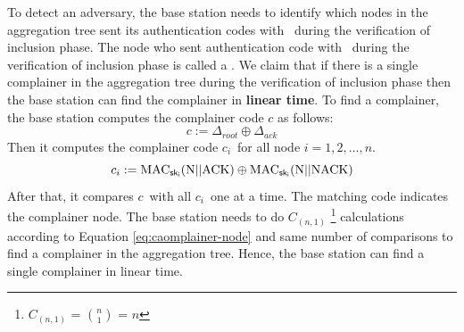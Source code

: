 		To detect an adversary, the base station needs to identify which nodes in the aggregation tree sent its authentication codes with \nack\ during the verification of inclusion phase.
		The node who sent authentication code with \nack\ during the verification of inclusion phase is called a \complainer. 
		We claim that if there is a single complainer in the aggregation tree during the verification of inclusion phase then the base station can find the complainer in \textbf{linear time}.
		To find a complainer, the base station computes the complainer code $c$ as follows:
		\begin{equation}
			\label{eq:complainer}
			c := \Delta_{root} \oplus \Delta_{ack}
		\end{equation}
		Then it computes the complainer code $c_{i}$\ for all node $i = 1, 2, \dotsc, n$. 
		\begin{equation}
			\label{eq:caomplainer-node}
			c_{i} := \mbox{MAC}_{\sf{sk}_{i}}(\mbox{N} || \mbox{ACK}) \oplus \mbox{MAC}_{\sf{sk}_{i}}(\mbox{N} || \mbox{NACK})
		\end{equation}
		After that, it compares $c$\ with all $c_{i}$\ one at a time. 
		The matching code indicates the complainer node.
		The base station needs to do $C_{(n,1)}$ \footnote{$C_{(n,1)}$ = $n \choose 1 $ = $n$} calculations according to Equation \ref{eq:caomplainer-node} and same number of comparisons to find a complainer in the aggregation tree. 
		Hence, the base station can find a single complainer in linear time.
